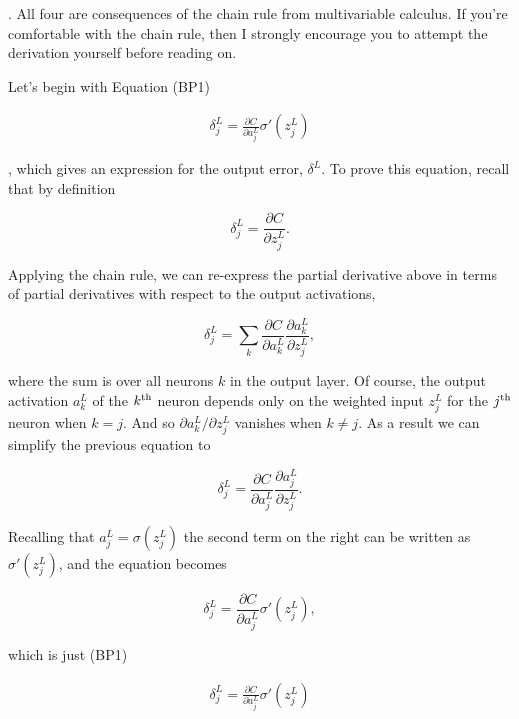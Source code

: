 \noindent. All four are consequences of the chain rule from multivariable calculus. If you're comfortable with the chain rule, then I strongly encourage you to attempt the derivation yourself before reading on.


Let's begin with Equation (BP1)

\begin{align*}
\delta^L_j = \frac{\partial C}{\partial a^L_j} \sigma'(z^L_j) \nonumber
\end{align*}

\noindent, which gives an expression for the output error, $\delta^L$. To prove this equation, recall that by definition

\begin{equation}
\delta^L_j = \frac{\partial C}{\partial z^L_j}.
\tag{36}
\end{equation}

\noindent Applying the chain rule, we can re-express the partial derivative above in terms of partial derivatives with respect to the output activations,

\begin{equation}
\delta^L_j = \sum_k \frac{\partial C}{\partial a^L_k} \frac{\partial a^L_k}{\partial z^L_j},
\tag{37}
\end{equation}

\noindent where the sum is over all neurons $k$ in the output layer. Of course, the output activation $a^L_k$ of the $k^{\rm th}$ neuron depends only on the weighted input $z^L_j$ for the $j^{\rm th}$ neuron when $k = j$. And so $\partial a^L_k / \partial z^L_j$ vanishes when $k \neq j$. As a result we can simplify the previous equation to

\begin{equation}
\delta^L_j = \frac{\partial C}{\partial a^L_j} \frac{\partial a^L_j}{\partial z^L_j}.
\tag{38}
\end{equation}

\noindent Recalling that $a^L_j = \sigma(z^L_j)$ the second term on the right can be written as $\sigma'(z^L_j)$, and the equation becomes

\begin{equation}
\delta^L_j = \frac{\partial C}{\partial a^L_j} \sigma'(z^L_j),
\tag{39}
\end{equation}

\noindent which is just (BP1)

\begin{align*}
\delta^L_j = \frac{\partial C}{\partial a^L_j} \sigma'(z^L_j) \nonumber
\end{align*}

